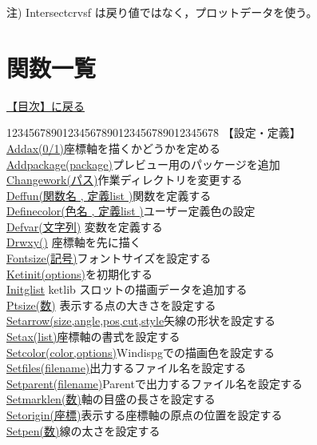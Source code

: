 \documentclass[papersize,a4paper,12pt,uplatex]{jsarticle}
\begin{document}
注) Intersectcrvsf は戻り値ではなく，プロットデータを使う。

\newpage
\hypertarget{functionlist}{}
\section{関数一覧}
\hyperlink{index}{【目次】に戻る}

\begin{tabbing}
12345678901234567890123456789012345678\=\kill
【設定・定義】\\
\hyperlink{addax}{Addax(0/1)}\>座標軸を描くかどうかを定める\\
\hyperlink{addpackage}{Addpackage(package)}\>プレビュー用のパッケージを追加\\
\hyperlink{changework}{Changework(パス)}\>作業ディレクトリを変更する\\
\hyperlink{deffun}{Deffun(関数名 , 定義list )}\>関数を定義する\\
\hyperlink{definecolor}{Definecolor(色名 , 定義list )}\>ユーザー定義色の設定\\
\hyperlink{defvar}{Defvar(文字列)} \>変数を定義する\\
\hyperlink{drwxy}{Drwxy()} \>座標軸を先に描く\\
\hyperlink{fontsize}{Fontsize(記号)}\>フォントサイズを設定する\\
\hyperlink{ketinit}{Ketinit(options)}\>\ketcindy を初期化する\\
\hyperlink{initglist}{Initglist} \> ketlib スロットの描画データを追加する\\
\hyperlink{ptsize}{Ptsize(数)} \>表示する点の大きさを設定する\\
\hyperlink{setarrow}{Setarrow(size,angle,pos,cut,style}\>矢線の形状を設定する\\
\hyperlink{setax}{Setax(list)}\>座標軸の書式を設定する\\
\hyperlink{setcolor}{Setcolor(color,options)}\>Windispgでの描画色を設定する\\
\hyperlink{setfiles}{Setfiles(filename)}\>出力するファイル名を設定する\\
\hyperlink{setparent}{Setparent(filename)}\>Parentで出力するファイル名を設定する\\
\hyperlink{setmarklen}{Setmarklen(数)}\>軸の目盛の長さを設定する\\
\hyperlink{setorigin}{Setorigin(座標)}\>表示する座標軸の原点の位置を設定する\\
\hyperlink{setpen}{Setpen(数)}\>線の太さを設定する\\

\end{tabbing}
\end{document}
